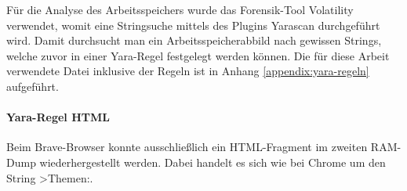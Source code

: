 Für die Analyse des Arbeitsspeichers wurde das Forensik-Tool Volatility verwendet, womit eine Stringsuche mittels des Plugins Yarascan durchgeführt wird. Damit durchsucht man ein Arbeitsspeicherabbild nach gewissen Strings, welche zuvor in einer Yara-Regel festgelegt werden können. Die für diese Arbeit verwendete Datei inklusive der Regeln ist in Anhang \ref{appendix:yara-regeln} aufgeführt. 

\paragraph*{Yara-Regel \glqq{}HTML\grqq{}}\label{chap:ergebnisse-brave-uncommon-locations-volatility-html}

Beim Brave-Browser konnte ausschließlich ein HTML-Fragment im zweiten RAM-Dump wiederhergestellt werden. Dabei handelt es sich wie bei Chrome um den String \glqq{}>Themen:\grqq.

